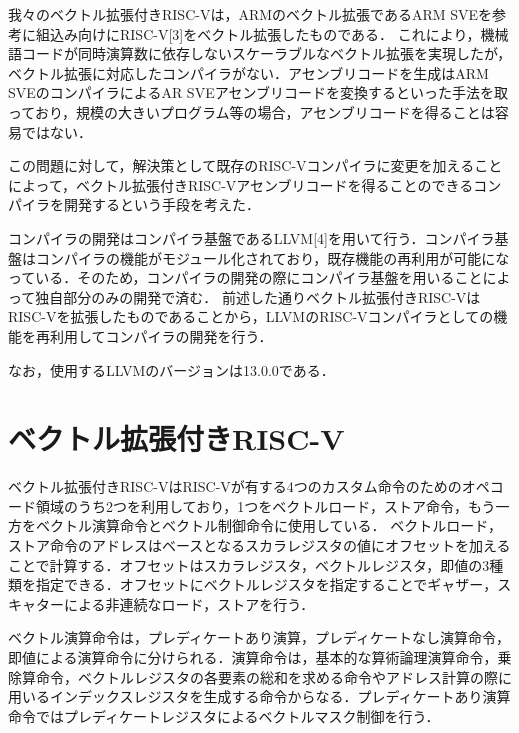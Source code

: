 \documentclass[a4paper,9pt, twocolumn]{jarticle}
\begin{document}
我々のベクトル拡張付きRISC-Vは，ARMのベクトル拡張であるARM SVE\cite{bib:arm_sve}を参考に組込み向けにRISC-V[3]をベクトル拡張したものである．
これにより，機械語コードが同時演算数に依存しないスケーラブルなベクトル拡張を実現したが，ベクトル拡張に対応したコンパイラがない．アセンブリコードを生成はARM SVEのコンパイラによるAR SVEアセンブリコードを変換するといった手法を取っており，規模の大きいプログラム等の場合，アセンブリコードを得ることは容易ではない．

この問題に対して，解決策として既存のRISC-Vコンパイラに変更を加えることによって，ベクトル拡張付きRISC-Vアセンブリコードを得ることのできるコンパイラを開発するという手段を考えた．

コンパイラの開発はコンパイラ基盤であるLLVM[4]を用いて行う．コンパイラ基盤はコンパイラの機能がモジュール化されており，既存機能の再利用が可能になっている．そのため，コンパイラの開発の際にコンパイラ基盤を用いることによって独自部分のみの開発で済む．
前述した通りベクトル拡張付きRISC-VはRISC-Vを拡張したものであることから，LLVMのRISC-Vコンパイラとしての機能を再利用してコンパイラの開発を行う．

なお，使用するLLVMのバージョンは13.0.0である．

\section{ベクトル拡張付きRISC-V}

ベクトル拡張付きRISC-VはRISC-Vが有する4つのカスタム命令のためのオペコード領域のうち2つを利用しており，1つをベクトルロード，ストア命令，もう一方をベクトル演算命令とベクトル制御命令に使用している．
ベクトルロード，ストア命令のアドレスはベースとなるスカラレジスタの値にオフセットを加えることで計算する．オフセットはスカラレジスタ，ベクトルレジスタ，即値の3種類を指定できる．オフセットにベクトルレジスタを指定することでギャザー，スキャターによる非連続なロード，ストアを行う．

ベクトル演算命令は，プレディケートあり演算，プレディケートなし演算命令，即値による演算命令に分けられる．演算命令は，基本的な算術論理演算命令，乗除算命令，ベクトルレジスタの各要素の総和を求める命令やアドレス計算の際に用いるインデックスレジスタを生成する命令からなる．プレディケートあり演算命令ではプレディケートレジスタによるベクトルマスク制御を行う．
\end{document}

